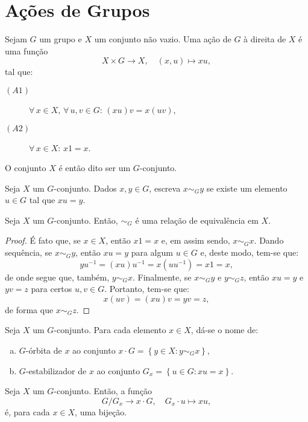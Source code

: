 \section{Ações de Grupos}\label{sec:ações-de-grupos}

\begin{definition}
  Sejam $G$ um grupo e $X$ um conjunto não vazio. Uma ação de $G$ à direita de $X$ é uma função
  \[
    X\times{G}\to{X},\quad{(x,u)\mapsto{xu}},
  \]
  tal que:
  \begin{description}
    \item[$(A1)$] $\forall\,x\in{X},\,\forall\,u,v\in{G}$: $(xu)v=x(uv)$,
    \item[$(A2)$] $\forall\,x\in{X}$: $x1=x$.
  \end{description}
  O conjunto $X$ é então dito ser um $G$-conjunto.
\end{definition}

Seja $X$ um $G$-conjunto. Dados $x,y\in{G}$, escreva $x\sim_{G}{y}$ se existe um elemento $u\in{G}$ tal que $xu=y$.

\begin{proposition}\label{prop:equivalence-relation-associated-with-an-action}
  Seja $X$ um $G$-conjunto. Então, $\sim_{G}$ é uma relação de equivalência em $X$.
\end{proposition}

\begin{proof}
  É fato que, se $x\in{X}$, então $x1=x$ e, em assim sendo, $x\sim_{G}x$. Dando sequência, se $x\sim_{G}y$, então $xu=y$ para algum $u\in{G}$ e, deste modo, tem-se que:
  \[
    yu^{-1}=(xu)u^{-1}=x(uu^{-1})=x1=x,
  \]
  de onde segue que, também, $y\sim_{G}x$. Finalmente, se $x\sim_{G}y$ e $y\sim_{G}z$, então $xu=y$ e $yv=z$ para certos $u,v\in{G}$. Portanto, tem-se que:
  \[
    x(uv)=(xu)v=yv=z,
  \]
  de forma que $x\sim_{G}z$.
\end{proof}

\begin{definition}
  Seja $X$ um $G$-conjunto. Para cada elemento $x\in{X}$, dá-se o nome de:
  \begin{enumerate}[a)]
    \item $G$-órbita de $x$ ao conjunto $x\cdot{G}=\left\{y\in{X}:y\sim_{G}x\right\}$,
    \item $G$-estabilizador de $x$ ao conjunto $G_{x}=\left\{u\in{G}:xu=x\right\}$.
  \end{enumerate}
\end{definition}

\begin{proposition}\label{prop:counting-orbits}
  Seja $X$ um $G$-conjunto. Então, a função
  \[
    G/G_{x}\to{x\cdot{G}},\quad{G_{x}\cdot{u}\mapsto{xu}},
  \]
  é, para cada $x\in{X}$, uma bijeção.
\end{proposition}

